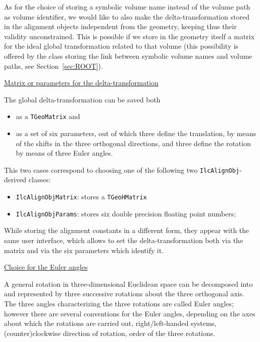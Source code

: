 \documentclass[12pt,a4paper,twoside]{article}
\begin{document}
{As for the choice of storing a symbolic volume name instead of the
volume path as volume identifier, we would like to also make the
delta-transformation stored in the alignment objects
independent from the geometry, keeping thus their validity
unconstrained. This is possible if we store in the geometry itself a
matrix for the ideal global transformation related to that volume
(this possibility is offered by the class storing the link between
symbolic volume names and volume paths, see Section~\ref{sec:ROOT}).


\underline{Matrix or parameters for the delta-transformation}

The global delta-transformation can be saved both
\begin{itemize}
\item as a \lstinline!TGeoMatrix! and
\item as a set of six parameters, out of which three define the
  translation, by means of the shifts in
  the three orthogonal directions, and three define the rotation
  by means of three Euler angles.
\end{itemize}
This two cases correspond to choosing one of the following two
\lstinline{IlcAlignObj}- derived classes:
\begin{itemize}
  \item \lstinline!IlcAlignObjMatrix!: stores a \lstinline!TGeoHMatrix!
  \item \lstinline!IlcAlignObjParams!: stores six double precision floating
  point numbers;
\end{itemize}
While storing the alignment constants in a different form, they appear
with the same user interface, which allows to set the
delta-transformation both via the matrix and via the six parameters
which identify it.


\underline{Choice for the Euler angles}

A general rotation in three-dimensional Euclidean space can be
decomposed into and represented by three successive rotations  about
the three orthogonal axis. The three angles characterizing the three
rotations are called Euler angles; however there are several
conventions for the Euler angles, depending on the axes
about which the rotations are carried out, right/left-handed systems,
(counter)clockwise direction of rotation, order of the three rotations.

}
\end{document}
